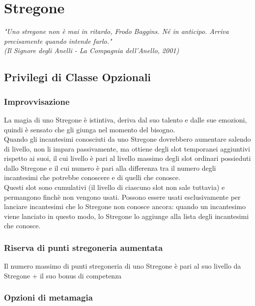 \chapter{Stregone}

\begin{DndReadAloud}
    \it
    "Uno stregone non è mai in ritardo, Frodo Baggins. Né in anticipo. Arriva precisamente quando intende farlo." \\ (Il Signore degli Anelli - La Compagnia dell'Anello, 2001)
  \end{DndReadAloud}

\section{Privilegi di Classe Opzionali}

\subsection{Improvvisazione}

La magia di uno Stregone è istintiva, deriva dal suo talento e dalle sue emozioni, quindi è sensato che gli giunga nel momento del bisogno. \\ Quando gli incantesimi conosciuti da uno Stregone dovrebbero aumentare salendo di livello, non li impara passivamente, ma ottiene degli slot temporanei aggiuntivi rispetto ai suoi, il cui livello è pari al livello massimo degli slot ordinari possieduti dallo Stregone e il cui numero è pari alla differenza tra il numero degli incantesimi che potrebbe conoscere e di quelli che conosce. \\ Questi slot sono cumulativi (il livello di ciascuno slot non sale tuttavia) e permangono finchè non vengono usati. Possono essere usati esclusivamente per lanciare incantesimi che lo Stregone non conosce ancora: quando un incantesimo viene lanciato in questo modo, lo Stregone lo aggiunge alla lista degli incantesimi che conosce.

\subsection{Riserva di punti stregoneria aumentata}

Il numero massimo di punti stregoneria di uno Stregone è pari al suo livello da Stregone + il suo bonus di competenza

\subsection{Opzioni di metamagia}

